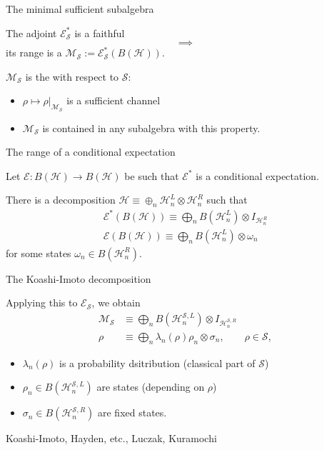 \documentclass[mathserif]{beamer}
\newcommand{\<}{\langle}
\renewcommand{\>}{\rangle}
\newcommand{\Se}{\mathcal S}
\newcommand{\Ee}{\mathcal E}
\newcommand{\Me}{\mathcal M}
\newcommand{\Ha}{\mathcal H}
\begin{document}
\begin{frame}{The minimal sufficient subalgebra}



The adjoint  $\Ee^*_\Se$ is a faithful  
\[
\implies
\]
its  range is a  $\Me_\Se:= \Ee^*_\Se(B(\Ha))$. \bigskip

$\Me_\Se$ is the  with respect to $\Se$:
\medskip
\begin{itemize}
\item $\rho\mapsto \rho|_{\Me_\Se}$ is a sufficient channel
\item $\Me_\Se$ is contained in any subalgebra with this property.

\end{itemize}



\end{frame}

\begin{frame}{The range of a conditional expectation}

Let $\Ee: B(\Ha)\to B(\Ha)$ be such that $\Ee^*$ is a conditional expectation.

\bigskip

There is a decomposition $\Ha\equiv\oplus_n \Ha_n^L\otimes \Ha_n^R$ such that 
\begin{align*}
\Ee^*(B(\Ha))\equiv \bigoplus_n B(\Ha_n^L)\otimes I_{\Ha_n^R}\\
\Ee(B(\Ha))\equiv \bigoplus_n B(\Ha_n^L)\otimes \omega_n
\end{align*}
for some   states  $\omega_n\in B(\Ha_n^R)$.
\end{frame}


\begin{frame}{The Koashi-Imoto decomposition}

Applying this to $\Ee_\Se$, we obtain
\begin{align*}
\Me_\Se&\equiv \bigoplus_n B(\Ha_n^{\Se,L})\otimes I_{\Ha_n^{\Se,R}}\\
\rho&\equiv \bigoplus_n \lambda_n(\rho) \rho_n\otimes \sigma_n,\qquad \rho\in \Se, 
\end{align*}

\begin{itemize}
\item $\lambda_n(\rho) $ is a probability dsitribution (classical part of $\Se$)
\item  $\rho_n\in B(\Ha_n^{\Se,L})$ are states
(depending on $\rho$) 
\item $\sigma_n\in B(\Ha_n^{\Se,R})$ are fixed states.
\end{itemize}

Koashi-Imoto, Hayden, etc., Luczak, Kuramochi
\end{frame}
\end{document}
